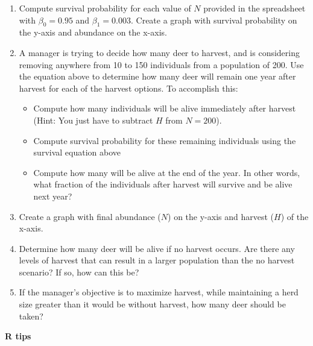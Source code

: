 \documentclass[12pt]{article}\usepackage[]{graphicx}\usepackage[]{xcolor}
\begin{document}
\begin{enumerate}
  \item Compute survival probability for each value of $N$ provided in
    the spreadsheet with $\beta_0=0.95$ and $\beta_1=0.003$. Create a
    graph with survival probability on the y-axis and abundance on the
    x-axis.
  \item A manager is trying to decide how many deer to harvest, and is
    considering removing anywhere from 10 to 150 individuals from a
    population of 200. Use the equation above to determine how many
    deer will remain one year after harvest for each of the harvest
    options. To accomplish this:
  \begin{itemize}
    \item Compute how many individuals will be alive immediately after
      harvest (Hint: You just have to subtract $H$ from $N=200$).
    \item Compute survival probability for these remaining individuals
      using the survival equation above
    \item Compute how many will be alive at the end of the year. In
      other words, what fraction of the individuals after harvest
      will survive and be alive next year?
  \end{itemize}
  \item Create a graph with final abundance ($N$) on the y-axis and
    harvest ($H$) of the x-axis. %
  \item Determine how many deer will be alive if no harvest
    occurs. Are there any levels of harvest that can result in a
    larger population than the no harvest scenario? If so, how can
    this be?
  \item If the manager's objective is to maximize harvest, while
    maintaining a herd size greater than it would be without harvest,
    how many deer should be taken?
\end{enumerate}


\newpage

{\bf R tips \\}
\end{document}
